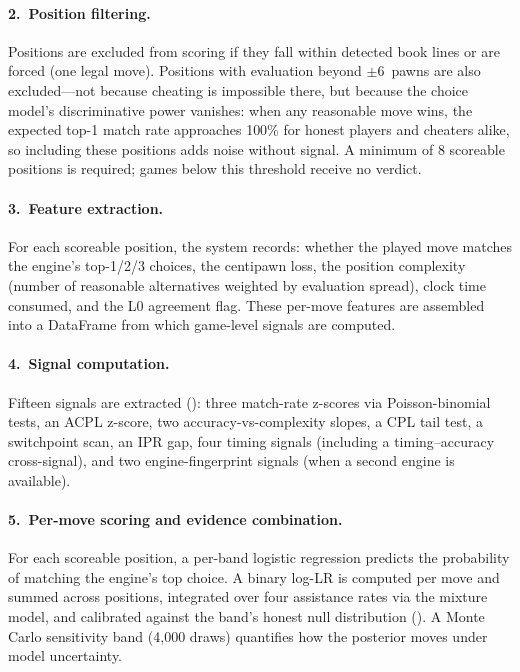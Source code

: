 \documentclass[11pt,a4paper]{article}
\theoremstyle{definition}
\begin{document}
\paragraph{2.\ Position filtering.}
Positions are excluded from scoring if they fall within detected book
lines or are forced (one legal move).  Positions with evaluation beyond
$\pm 6$~pawns are also excluded---not because cheating is impossible
there, but because the choice model's discriminative power vanishes:
when any reasonable move wins, the expected top-1 match rate approaches
100\% for honest players and cheaters alike, so including these
positions adds noise without signal.  A minimum of 8 scoreable
positions is required; games below this threshold receive no verdict.

\paragraph{3.\ Feature extraction.}
For each scoreable position, the system records: whether the played move
matches the engine's top-1/2/3 choices, the centipawn loss, the position
complexity (number of reasonable alternatives weighted by evaluation
spread), clock time consumed, and the L0 agreement flag.  These per-move
features are assembled into a DataFrame from which game-level signals
are computed.

\paragraph{4.\ Signal computation.}
Fifteen signals are extracted (): three match-rate
z-scores via Poisson-binomial tests, an ACPL z-score, two
accuracy-vs-complexity slopes, a CPL tail test, a switchpoint scan, an
IPR gap, four timing signals (including a timing--accuracy
cross-signal), and two engine-fingerprint signals (when a second
engine is available).

\paragraph{5.\ Per-move scoring and evidence combination.}
For each scoreable position, a per-band logistic regression predicts the
probability of matching the engine's top choice.  A binary log-LR is
computed per move and summed across positions, integrated over four
assistance rates via the mixture model, and calibrated against the
band's honest null distribution ().
A Monte Carlo sensitivity band (4{,}000 draws) quantifies how the
posterior moves under model uncertainty.
\end{document}
